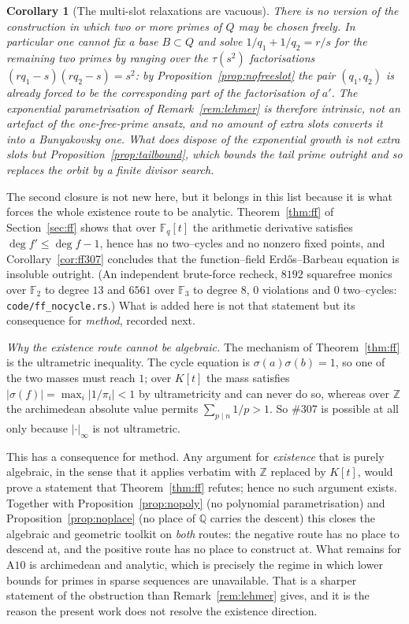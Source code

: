 \documentclass[11pt]{article}
\newtheorem{corollary}[theorem]{Corollary}
\theoremstyle{definition}
\begin{document}
\begin{corollary}[The multi-slot relaxations are vacuous]\label{cor:noslack}
There is no version of the construction in which two or more primes of $Q$ may be chosen freely.
In particular one cannot fix a base $B\subset Q$ and solve $1/q_1+1/q_2=r/s$ for the remaining two
primes by ranging over the $\tau(s^2)$ factorisations $(rq_1-s)(rq_2-s)=s^2$: by
Proposition~\ref{prop:nofreeslot} the pair $(q_1,q_2)$ is already forced to be the corresponding
part of the factorisation of $a'$. The exponential parametrisation of
Remark~\textup{\ref{rem:lehmer}} is therefore intrinsic, not an artefact of the one-free-prime
ansatz, and no amount of extra slots converts it into a Bunyakovsky one. What does dispose of the
exponential growth is not extra slots but Proposition~\ref{prop:tailbound}, which bounds the tail
prime outright and so replaces the orbit by a finite divisor search.
\end{corollary}

The second closure is not new here, but it belongs in this list because it is what forces the whole
existence route to be analytic. Theorem~\ref{thm:ff} of Section~\ref{sec:ff} shows that over
$\mathbb{F}_q[t]$ the arithmetic derivative satisfies $\deg f'\le\deg f-1$, hence has no two--cycles
and no nonzero fixed points, and Corollary~\ref{cor:ff307} concludes that the function--field
Erd\H{o}s--Barbeau equation is insoluble outright. \textup{(An independent brute-force recheck,
$8192$ squarefree monics over $\mathbb{F}_2$ to degree $13$ and $6561$ over $\mathbb{F}_3$ to
degree $8$, $0$ violations and $0$ two--cycles: \texttt{code/ff\_nocycle.rs}.)} What is added here
is not that statement but its consequence for \emph{method}, recorded next.

\emph{Why the existence route cannot be algebraic.} The mechanism of Theorem~\ref{thm:ff} is the ultrametric inequality. The cycle equation is
$\sigma(a)\sigma(b)=1$, so one of the two masses must reach $1$; over $K[t]$ the mass satisfies
$|\sigma(f)|=\max_i|1/\pi_i|<1$ by ultrametricity and can never do so, whereas over $\mathbb{Z}$ the
archimedean absolute value permits $\sum_{p\mid n}1/p>1$. So \#307 is possible at all only because
$|\cdot|_\infty$ is not ultrametric.

This has a consequence for method. Any argument for \emph{existence} that is purely algebraic, in
the sense that it applies verbatim with $\mathbb{Z}$ replaced by $K[t]$, would prove a statement
that Theorem~\ref{thm:ff} refutes; hence no such argument exists. Together with
Proposition~\ref{prop:nopoly} (no polynomial parametrisation) and Proposition~\ref{prop:noplace}
(no place of $\mathbb{Q}$ carries the descent) this closes the algebraic and geometric toolkit on
\emph{both} routes: the negative route has no place to descend at, and the positive route has no
place to construct at. What remains for $\mathrm{A}10$ is archimedean and analytic, which is
precisely the regime in which lower bounds for primes in sparse sequences are unavailable. That is
a sharper statement of the obstruction than Remark~\ref{rem:lehmer} gives, and it is the reason the
present work does not resolve the existence direction.
\end{document}
